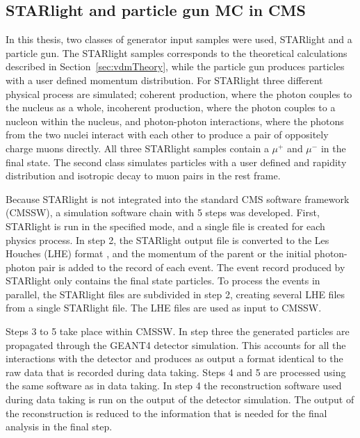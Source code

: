   \subsection{STARlight and particle gun MC in CMS}
    In this thesis, two classes of generator input samples were used, 
      STARlight and a particle gun.
    The STARlight samples corresponds to the theoretical calculations 
      described in Section~\ref{sec:vdmTheory}, while the particle gun produces
      particles with a user defined momentum distribution. 
    For STARlight three different physical process are simulated;
      coherent \JPsi{} production, where the photon couples to the nucleus as
      a whole, incoherent \JPsi{} production, where the photon couples to a
      nucleon within the nucleus, and photon-photon interactions, where the 
      photons from the two nuclei interact with each other to produce a pair 
      of oppositely charge muons directly.
    All three STARlight samples contain a $\mu^{+}$ and $\mu^{-}$ in the final 
      state.
    The second class simulates \JPsi{} particles with a user 
      defined \pt{} and rapidity distribution and isotropic decay to muon pairs
      in the \JPsi{} rest frame.

    Because STARlight is not integrated into the standard CMS software 
      framework (CMSSW), a simulation software chain with 5 steps was developed.
    First, STARlight is run in the specified mode, and a single file is 
      created for each physics process. 
    In step 2, the STARlight output file is converted to the Les Houches (LHE) 
      format \cite{lheFormat}, and the momentum of the parent \JPsi{} or the 
      initial photon-photon pair is added to the record of each event.
    The event record produced by STARlight only contains the final state 
      particles.
    To process the events in parallel, the STARlight files are subdivided 
      in step 2, creating several LHE files from a single STARlight file.
    The LHE files are used as input to CMSSW.

    Steps 3 to 5 take place within CMSSW. 
    In step three the generated particles are propagated through the GEANT4 
      \cite{geant} detector simulation.
    This accounts for all the interactions with the detector and produces as 
      output a format identical to the raw data that is recorded during data
      taking.
    Steps 4 and 5 are processed using the same software as in data taking.
    In step 4 the reconstruction software used during data taking is run on 
      the output of the detector simulation.
    The output of the reconstruction is reduced to the information that is 
      needed for the final analysis in the final step.


